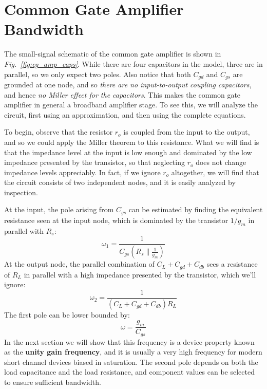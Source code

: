 \section{Common Gate Amplifier Bandwidth}
The small-signal schematic of the common gate amplifier is shown in \emph{Fig.~\ref{fig:cg_amp_caps}}. While there are four capacitors in the model, three are in parallel, so we only expect two poles.  Also notice that both $C_{gd}$ and $C_{gs}$ are grounded at one node, and so \textit{there are no input-to-output coupling capacitors}, and hence \textit{no Miller effect for the capacitors}.  This makes the common gate amplifier in general a broadband amplifier stage.  To see this, we will analyze the circuit, first using an approximation, and then using the complete equations.

To begin, observe that the resistor $r_o$ is coupled from the input to the output, and so we could apply the Miller theorem to this resistance.  What we will find is that the impedance level at the input is low enough and dominated by the low impedance presented by the transistor, so that neglecting $r_o$ does not change impedance levels appreciably.  In fact, if we ignore $r_o$ altogether, we will find that the circuit consists of two independent nodes, and it is easily analyzed by inspection.

At the input, the pole arising from $C_{gs}$ can be estimated by finding the equivalent resistance seen at the input node, which is dominated by the transistor $1/g_m$ in parallel with $R_s$:
    \begin{equation}
        \omega_1 = \frac{1}{C_{gs} \left(R_s \parallel \frac{1}{g_m}\right)}
    \end{equation}    
At the output node, the parallel combination of $C_L + C_{gd} + C_{db}$ sees a resistance of $R_L$ in parallel with a high impedance presented by the transistor, which we'll ignore:
    \begin{equation}
        \omega_2 = \frac{1}{(C_{L} + C_{gd} + C_{db}) R_L}
    \end{equation}    
The first pole can be lower bounded by:
    \begin{equation}
        \omega = \frac{g_m}{C_{gs}}
    \end{equation}
In the next section we will show that this frequency is a device property known as the \textbf{unity gain frequency}, and it is usually a very high frequency for modern short channel devices biased in saturation.  The second pole depends on both the load capacitance and the load resistance, and component values can be selected to ensure sufficient bandwidth.

